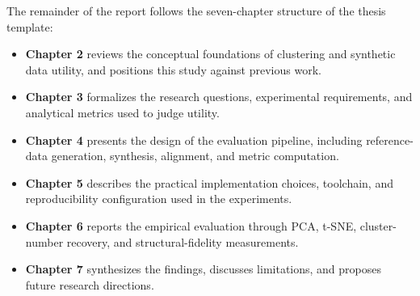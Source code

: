 The remainder of the report follows the seven-chapter structure of the thesis template:
\begin{itemize}
  \item \textbf{Chapter 2} reviews the conceptual foundations of clustering and synthetic data utility, and positions this study against previous work.
  \item \textbf{Chapter 3} formalizes the research questions, experimental requirements, and analytical metrics used to judge utility.
  \item \textbf{Chapter 4} presents the design of the evaluation pipeline, including reference-data generation, synthesis, alignment, and metric computation.
  \item \textbf{Chapter 5} describes the practical implementation choices, toolchain, and reproducibility configuration used in the experiments.
  \item \textbf{Chapter 6} reports the empirical evaluation through PCA, t-SNE, cluster-number recovery, and structural-fidelity measurements.
  \item \textbf{Chapter 7} synthesizes the findings, discusses limitations, and proposes future research directions.
\end{itemize}
